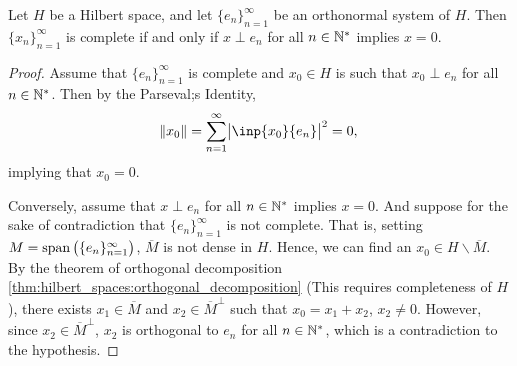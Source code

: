 \begin{thm}
Let $H$ be a Hilbert space, and let $\{ e_n \}_{n=1}^{\infty}$ be an 
orthonormal system of $H$.
Then $\{ x_n \}_{n=1}^{\infty}$ is complete if and only if $x \perp e_n$ 
for all $n \in \mathbb{N}^\ast$ implies $x = 0$. 
\end{thm}
\begin{proof}
Assume that $\{ e_n \}_{n=1}^{\infty}$ is complete and $x_0 \in H$ is such 
that $x_0 \perp e_n$ for all $n \in \mathbb{N}^\ast$. 
Then by the Parseval;s Identity, 
\begin{equation*}
    \norm{x_0} = \sum_{n=1}^{\infty} \abs{\inp{x_0}{e_n}}^2 = 0, 
\end{equation*}
implying that $x_0 = 0$. 

Conversely, assume that  $x \perp e_n$ for all $n \in \mathbb{N}^\ast$ implies $x = 0$.
And suppose for the sake of contradiction that $\{ e_n \}_{n=1}^{\infty}$ 
is not complete. 
That is, setting $M = \operatorname{span}\left( \{ e_n \}_{n=1}^{\infty} \right)$, 
$\overline{M}$ is not dense in $H$. 
Hence, we can find an $x_0 \in H \backslash \overline{M}$. 
By the theorem of orthogonal decomposition 
\ref{thm:hilbert_spaces:orthogonal_decomposition} (This requires 
completeness of $H$), there exists $x_1 \in \overline{M}$ and $x_2 \in 
\overline{M}^\perp$ such that $x_0 = x_1 + x_2$, $x_2 \neq 0$. 
However, since $x_2 \in \overline{M}^\perp$, $x_2$ is orthogonal to $e_n$ 
for all $n \in \mathbb{N}^\ast$, which is a contradiction to the hypothesis.
\end{proof}

